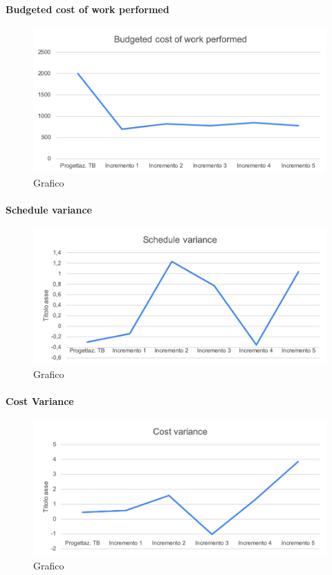 	\paragraph{Budgeted cost of work performed}
		\begin{figure}[H]
			\centering
			\includegraphics[width=0.8\linewidth]{./res/images/BCWP_1.png}
			\caption{Grafico }
			\label{fig:Grafico contenente il valore del prodotto in Euro per fase}
		\end{figure}

	\paragraph{Schedule variance}
		\begin{figure}[H]
			\centering
			\includegraphics[width=0.8\linewidth]{./res/images/SV_1.png}
			\caption{Grafico }
			\label{fig:Grafico contenente la schedule variance per fase}
		\end{figure}

	\paragraph{Cost Variance}
		\begin{figure}[H]
			\centering
			\includegraphics[width=0.8\linewidth]{./res/images/CV_1.png}
			\caption{Grafico }
			\label{fig:Grafico contenente la cost variance per fase}
		\end{figure}

